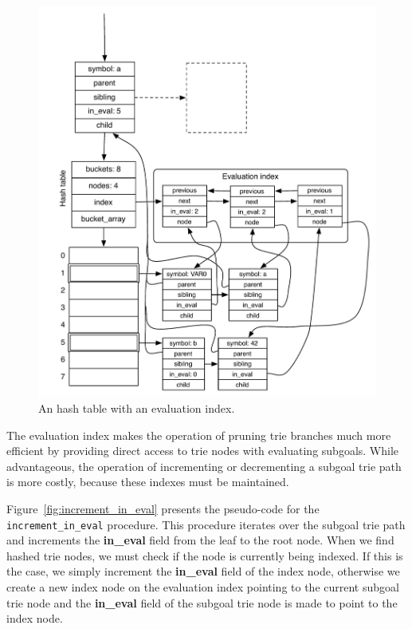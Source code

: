 \begin{figure}[ht]
  \centering
  \includegraphics[scale=0.6]{hash_table_evaluation_index.pdf}
  \caption{An hash table with an evaluation index.}
  \label{fig:hash_table_evaluation_index}
\end{figure}

The evaluation index makes the operation of pruning trie branches much
more efficient by providing direct access to trie nodes with
evaluating subgoals. While advantageous, the operation of incrementing
or decrementing a subgoal trie path is more costly, because these
indexes must be maintained.

Figure~\ref{fig:increment_in_eval} presents the pseudo-code for the
\texttt{increment\_in\_eval} procedure. This procedure iterates over the
subgoal trie path and increments the \textbf{in\_eval} field from the leaf to
the root node. When we find hashed trie nodes, we must check if the
node is currently being indexed. If this is the case, we simply
increment the \textbf{in\_eval} field of the index node, otherwise we create
a new index node on the evaluation index pointing to the current
subgoal trie node and the \textbf{in\_eval} field of the subgoal trie node is
made to point to the index node.


